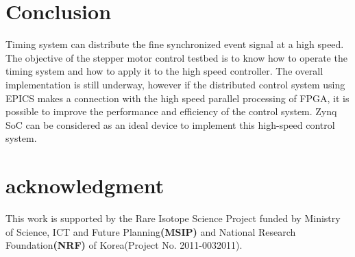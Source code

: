 \documentclass[a4paper,
              ]{jacow}
\newcommand\SEC[1]{\textbf{\uppercase{#1}}}
\begin{document}
\newpage
\section{Conclusion}
Timing system can distribute the fine synchronized event signal at a high speed. The objective of the stepper motor control testbed is to know how to operate the timing system and how to apply it to the high speed controller. The overall implementation is still underway, however if the distributed control system using EPICS makes a connection with the high speed parallel processing of FPGA, it is possible to improve the performance and efficiency of the control system. Zynq SoC can be considered as an ideal device to implement this high-speed control system.

\section{acknowledgment}
This work is supported by the Rare Isotope Science Project funded by Ministry of Science, ICT and Future Planning\SEC{(MSIP)} and National Research Foundation\SEC{(NRF)} of Korea(Project No. 2011-0032011).

%
%
\iftrue   %
	\raggedend
\fi

\iffalse  %
	\printbibliography

\else
\end{document}
